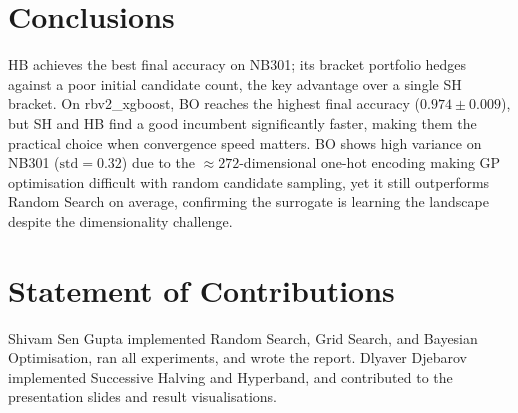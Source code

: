 \documentclass{AIM_report}
\begin{document}
\section{Conclusions}

HB achieves the best final accuracy on NB301; its bracket portfolio
hedges against a poor initial candidate count, the key advantage over
a single SH bracket.
On rbv2\_xgboost, BO reaches the highest final accuracy
($0.974{\pm}0.009$), but SH and HB find a good incumbent significantly
faster, making them the practical choice when convergence speed matters.
BO shows high variance on NB301 ($\text{std}{=}0.32$) due to the
${\approx}272$-dimensional one-hot encoding making GP optimisation
difficult with random candidate sampling, yet it still outperforms
Random Search on average, confirming the surrogate is learning the
landscape despite the dimensionality challenge.

\section*{Statement of Contributions}

Shivam Sen Gupta implemented Random Search, Grid Search, and Bayesian
Optimisation, ran all experiments, and wrote the report.
Dlyaver Djebarov implemented Successive Halving and Hyperband, and
contributed to the presentation slides and result visualisations.




\newpage
\pagestyle{empty}

\end{document}
